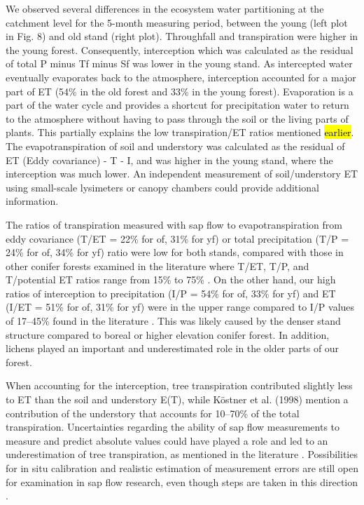 \documentclass[10pt,letterpaper]{article}
\begin{document}
We observed several differences in the ecosystem water partitioning at the catchment level for the 5-month measuring period, between the young (left plot in Fig. 8) and old stand (right plot). Throughfall and transpiration were higher in the young forest. Consequently, interception which was calculated as the residual of total P minus Tf minus Sf was lower in the young stand. As intercepted water eventually evaporates back to the atmosphere, interception accounted for a major part of ET (54\% in the old forest and 33\% in the young forest). Evaporation is a part of the water cycle and provides a shortcut for precipitation water to return to the atmosphere without having to pass through the soil or the living parts of plants. This partially explains the low transpiration/ET ratios mentioned \hl{earlier}. The evapotranspiration of soil and understory was calculated as the residual of ET (Eddy covariance) - T - I, and was higher in the young stand, where the interception was much lower. An independent measurement of soil/understory ET using small-scale lysimeters or canopy chambers could provide additional information. 

The ratios of transpiration measured with sap flow to evapotranspiration from eddy covariance (T/ET = 22\% for of, 31\% for yf) or total precipitation (T/P = 24\% for of, 34\% for yf) ratio were low for both stands, compared with those in other conifer forests examined in the literature where T/ET, T/P, and T/potential ET ratios range from 15\% to 75\% \cite{Cienciala,GRELLE199770,LAGERGREN20082312,BRITO2015120,Matyssek2009,SOUBIE2016191}. On the other hand, our high ratios of interception to precipitation (I/P = 54\% for of, 33\% for yf) and ET (I/ET = 51\% for of, 31\% for yf) were in the upper range compared to I/P values of 17–45\% found in the literature \cite{GRELLE199770,Koestner,Matyssek2009,SOUBIE2016191}. This was likely caused by the denser stand structure compared to boreal or higher elevation conifer forest. In addition, lichens played an important and underestimated role in the older parts of our forest. 

When accounting for the interception, tree transpiration contributed slightly less to ET than the soil and understory E(T), while Köstner et al. (1998) mention a contribution of the understory that accounts for 10–70\% of the total transpiration. Uncertainties regarding the ability of sap flow measurements to measure and predict absolute values could have played a role and led to an underestimation of tree transpiration, as mentioned in the literature \cite{Wilson,SCHLESINGER2014115,FLO2019362}. Possibilities for in situ calibration and realistic estimation of measurement errors are still open for examination in sap flow research, even though steps are taken in this direction \cite{Peters,FLO2019362}. 
\end{document}
